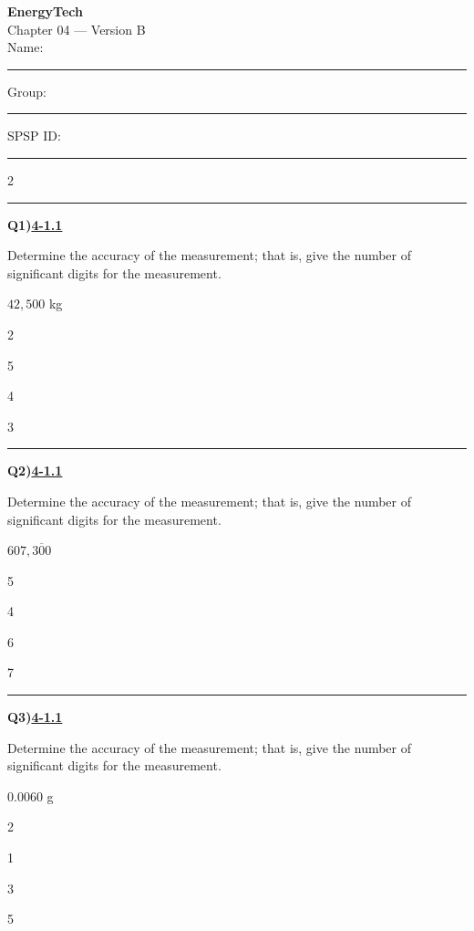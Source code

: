 \documentclass[11pt]{article}
\newenvironment{Qbox}[2]{%
  \par\medskip\noindent\begin{minipage}{\linewidth}%
  \hrule\medskip%
  \textbf{Q#1)}\hfill\textbf{\underline{#2}}\par\smallskip%
}{\par\end{minipage}\par\medskip}
\begin{document}
\begin{center}
  {\LARGE\bfseries EnergyTech}\\[2pt]
  {\Large Chapter 04 --- Version B}\\[6pt]
  Name: \rule{4.5cm}{0.4pt}\quad Group: \rule{3cm}{0.4pt}\quad SPSP ID: \rule{3.5cm}{0.4pt}
\end{center}

\begin{multicols}{2}
\raggedcolumns
\begin{Qbox}{1}{4-1.1}
Determine the accuracy of the measurement; that is, give the number of significant digits for the measurement.\par\medskip $42{,}500$ kg
\begin{choices}
  \item 2
  \item 5
  \item 4
  \item 3
\end{choices}
\end{Qbox}

\begin{Qbox}{2}{4-1.1}
Determine the accuracy of the measurement; that is, give the number of significant digits for the measurement.\par\medskip $607{,}3\overline{0}0$
\begin{choices}
  \item 5
  \item 4
  \item 6
  \item 7
\end{choices}
\end{Qbox}

\begin{Qbox}{3}{4-1.1}
Determine the accuracy of the measurement; that is, give the number of significant digits for the measurement.\par\medskip $0.0060$ g
\begin{choices}
  \item 2
  \item 1
  \item 3
  \item 5
\end{choices}
\end{Qbox}


\end{multicols}
\end{document}
